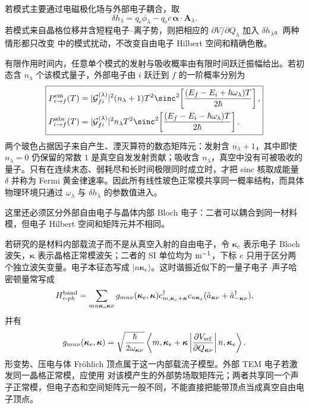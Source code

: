 若模式主要通过电磁极化场与外部电子耦合，取
\begin{equation*}
\delta h_\lambda
=q_{\mathrm e}\phi_\lambda
-q_{\mathrm e} c\,\boldsymbol\alpha\cdot\mathbf A_\lambda.
\end{equation*}
若模式来自晶格位移并含短程电子--离子势，则把相应的 $\partial V/\partial Q_\lambda$ 加入 $\delta h_\lambda$。两种情形都只改变 中的模式扰动，不改变自由电子 Hilbert 空间和精确色散。

有限作用时间内，任意单个模式的发射与吸收概率由有限时间跃迁振幅给出。若初态含 $n_\lambda$ 个该模式量子，外部电子由 $i$ 跃迁到 $f$ 的一阶概率分别为
\begin{equation}
\boxed{
\begin{aligned}
P_{i\to f}^{\rm em}(T)
&=|\mathcal G_{fi}^{(\lambda)}|^2(n_\lambda+1)T^2
\sinc^2\!\left[\frac{(E_f-E_i+\hbar\omega_\lambda)T}{2\hbar}\right],\\
P_{i\to f}^{\rm abs}(T)
&=|\mathcal G_{fi}^{(\lambda)}|^2n_\lambda T^2
\sinc^2\!\left[\frac{(E_f-E_i-\hbar\omega_\lambda)T}{2\hbar}\right].
\end{aligned}}
\label{eq:mode-emission-absorption-finite-time-dp68}
\end{equation}
两个玻色占据因子来自产生、湮灭算符的数态矩阵元：发射含 $n_\lambda+1$，其中即使 $n_\lambda=0$ 仍保留的常数 $1$ 是真空自发发射贡献；吸收含 $n_\lambda$，真空中没有可被吸收的量子。只有在连续末态、弱耗尽和长时间极限同时成立时，才把 sinc 核取成能量 $\delta$ 并称为 Fermi 黄金律速率。因此所有线性玻色正常模共享同一概率结构，而具体物理环境只通过 $\omega_\lambda$ 与 $\delta h_\lambda$ 的参数值进入。

这里还必须区分外部自由电子与晶体内部 Bloch 电子：二者可以耦合到同一材料模，但电子 Hilbert 空间和矩阵元并不相同。

若研究的是材料内部载流子而不是从真空入射的自由电子，令 $\boldsymbol\kappa_e$ 表示电子 Bloch 波矢，$\boldsymbol\kappa$ 表示晶格正常模波矢；二者的 SI 单位均为 ${\rm m^{-1}}$，下标 $e$ 只用于区分两个独立波矢变量。电子本征态写成 $|n\boldsymbol\kappa_e\rangle$。这时谐振近似下的一量子电子--声子哈密顿量常写成
\begin{equation*}
H_{e\text{-}ph}^{\rm band}
=\sum_{mn\boldsymbol\kappa_e\boldsymbol\kappa\nu}
 g_{mn\nu}(\boldsymbol\kappa_e,\boldsymbol\kappa)
 c_{m,\boldsymbol\kappa_e+\boldsymbol\kappa}^\dagger c_{n\boldsymbol\kappa_e}
 (\hat a_{\boldsymbol\kappa\nu}+\hat a_{-\boldsymbol\kappa\nu}^\dagger),
\end{equation*}
并有
\begin{equation*}
 g_{mn\nu}(\boldsymbol\kappa_e,\boldsymbol\kappa)
=\sqrt{\frac{\hbar}{2\omega_{\boldsymbol\kappa\nu}}}
\left\langle m,\boldsymbol\kappa_e+\boldsymbol\kappa\left|
\frac{\partial V_{\rm scf}}{\partial Q_{\boldsymbol\kappa\nu}}
\right|n,\boldsymbol\kappa_e\right\rangle.
\end{equation*}
形变势、压电与体 Fr\"ohlich 顶点属于这一内部载流子模型。外部 TEM 电子若激发同一晶格正常模，应使用 对该模产生的外部势场取矩阵元；两者共享同一个声子正常模，但电子态和空间矩阵元一般不同，不能直接把能带顶点当成真空自由电子顶点。

